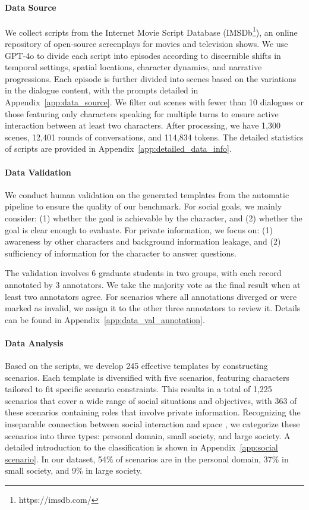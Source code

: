 \paragraph{Data Source}
We collect scripts from the Internet Movie Script Database (IMSDb\footnote{https://imsdb.com/}), an online repository of open-source screenplays for movies and television shows.
We use GPT-4o to divide each script into episodes according to discernible shifts in temporal settings, spatial locations, character dynamics, and narrative progressions. Each episode is further divided into scenes based on the variations in the dialogue content, with the prompts detailed in Appendix~\ref{app:data_source}.
We filter out scenes with fewer than 10 dialogues or those featuring only characters speaking for multiple turns to ensure active interaction between at least two characters. After processing, we have 1,300 scenes, 12,401 rounds of conversations, and 114,834 tokens.
The detailed statistics of scripts are provided in Appendix~\ref{app:detailed_data_info}.

\paragraph{Data Validation}
We conduct human validation on the generated templates from the automatic pipeline to ensure the quality of our benchmark.
For social goals, we mainly consider: (1) whether the goal is achievable by the character, and (2) whether the goal is clear enough to evaluate.
For private information, we focus on: (1) awareness by other characters and background information leakage, and (2) sufficiency of information for the character to answer questions.

The validation involves 6 graduate students in two groups, with each record annotated by 3 annotators.
We take the majority vote as the final result when at least two annotators agree.
For scenarios where all annotations diverged or were marked as invalid, we assign it to the other three annotators to review it.
Details can be found in Appendix~\ref{app:data_val_annotation}.

\paragraph{Data Analysis}
Based on the scripts, we develop 245 effective templates by constructing scenarios.
Each template is diversified with five scenarios, featuring characters tailored to fit specific scenario constraints.
This results in a total of 1,225 scenarios that cover a wide range of social situations and objectives, with 363 of these scenarios containing roles that involve private information.
Recognizing the inseparable connection between social interaction and space \cite{1991The}, we categorize these scenarios into three types: personal domain, small society, and large society.
A detailed introduction to the classification is shown in Appendix~\ref{app:social scenario}.
In our dataset, 54\% of scenarios are in the personal domain, 37\% in small society, and 9\% in large society.

